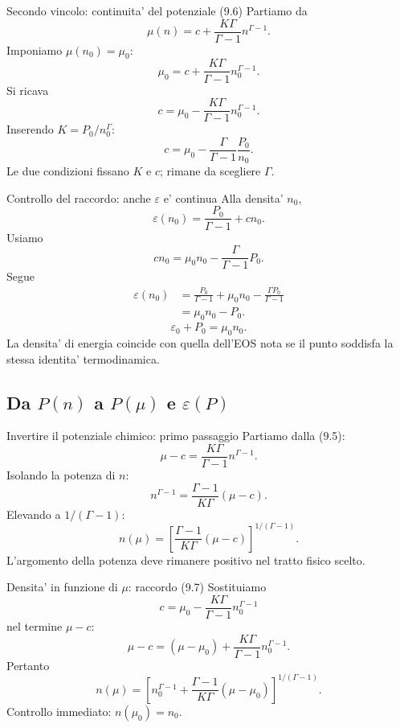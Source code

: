 \begin{frame}{Secondo vincolo: continuita' del potenziale (9.6)}
\small
Partiamo da
\[
\mu(n)=c+\frac{K\Gamma}{\Gamma-1}n^{\Gamma-1}.
\]
Imponiamo $\mu(n_0)=\mu_0$:
\[
\mu_0=c+\frac{K\Gamma}{\Gamma-1}n_0^{\Gamma-1}.
\]
Si ricava
\[
{c=\mu_0-\frac{K\Gamma}{\Gamma-1}n_0^{\Gamma-1}.}
\]
Inserendo $K=P_0/n_0^\Gamma$:
\[
{c=\mu_0-\frac{\Gamma}{\Gamma-1}\frac{P_0}{n_0}.}
\]
Le due condizioni fissano $K$ e $c$; rimane da scegliere $\Gamma$.
\end{frame}

\begin{frame}{Controllo del raccordo: anche $\varepsilon$ e' continua}
\small
Alla densita' $n_0$,
\[
\varepsilon(n_0)=\frac{P_0}{\Gamma-1}+cn_0.
\]
Usiamo
\[
cn_0=\mu_0n_0-\frac{\Gamma}{\Gamma-1}P_0.
\]
Segue
\[
\begin{aligned}
\varepsilon(n_0)
&=\frac{P_0}{\Gamma-1}+\mu_0n_0
-\frac{\Gamma P_0}{\Gamma-1}\\
&=\mu_0n_0-P_0.
\end{aligned}
\]
\[
{\varepsilon_0+P_0=\mu_0n_0.}
\]
La densita' di energia coincide con quella dell'EOS nota se il punto soddisfa la stessa identita' termodinamica.
\end{frame}

\subsection{Da $P(n)$ a $P(\mu)$ e $\varepsilon(P)$}

\begin{frame}{Invertire il potenziale chimico: primo passaggio}
\small
Partiamo dalla (9.5):
\[
\mu-c=\frac{K\Gamma}{\Gamma-1}n^{\Gamma-1}.
\]
Isolando la potenza di $n$:
\[
n^{\Gamma-1}=\frac{\Gamma-1}{K\Gamma}(\mu-c).
\]
Elevando a $1/(\Gamma-1)$:
\[
{n(\mu)=\left[\frac{\Gamma-1}{K\Gamma}(\mu-c)\right]^{1/(\Gamma-1)}.}
\]
L'argomento della potenza deve rimanere positivo nel tratto fisico scelto.
\end{frame}

\begin{frame}{Densita' in funzione di $\mu$: raccordo (9.7)}
\small
Sostituiamo
\[
c=\mu_0-\frac{K\Gamma}{\Gamma-1}n_0^{\Gamma-1}
\]
nel termine $\mu-c$:
\[
\mu-c=(\mu-\mu_0)+\frac{K\Gamma}{\Gamma-1}n_0^{\Gamma-1}.
\]
Pertanto
\[
{
 n(\mu)=\left[n_0^{\Gamma-1}
 +\frac{\Gamma-1}{K\Gamma}(\mu-\mu_0)
 \right]^{1/(\Gamma-1)}.}
\]
Controllo immediato: $n(\mu_0)=n_0$.
\end{frame}

